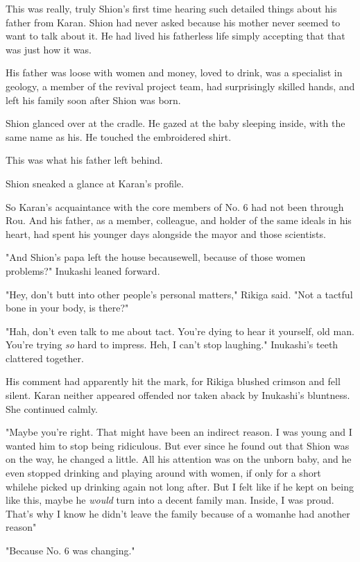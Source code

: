 This was really, truly Shion's first time hearing such detailed things
about his father from Karan. Shion had never asked because his mother
never seemed to want to talk about it. He had lived his fatherless life
simply accepting that that was just how it was.

His father was loose with women and money, loved to drink, was a
specialist in geology, a member of the revival project team, had
surprisingly skilled hands, and left his family soon after Shion was
born.

Shion glanced over at the cradle. He gazed at the baby sleeping inside,
with the same name as his. He touched the embroidered shirt.

This was what his father left behind.

Shion sneaked a glance at Karan's profile.

So Karan's acquaintance with the core members of No. 6 had not been
through Rou. And his father, as a member, colleague, and holder of the
same ideals in his heart, had spent his younger days alongside the mayor
and those scientists.

"And Shion's papa left the house because\el well, because of those women
problems?" Inukashi leaned forward.

"Hey, don't butt into other people's personal matters," Rikiga said.
"Not a tactful bone in your body, is there?"

"Hah, don't even talk to me about tact. You're dying to hear it
yourself, old man. You're trying \emph{so} hard to impress. Heh, I can't stop
laughing." Inukashi's teeth clattered together.

His comment had apparently hit the mark, for Rikiga blushed crimson and
fell silent. Karan neither appeared offended nor taken aback by
Inukashi's bluntness. She continued calmly.

"Maybe you're right. That might have been an indirect reason. I
was young and I wanted him to stop being ridiculous. But ever since he
found out that Shion was on the way, he changed a little. All his
attention was on the unborn baby, and he even stopped drinking and
playing around with women, if only for a short while\el he picked up
drinking again not long after. But I felt like if he kept on being like
this, maybe he \emph{would} turn into a decent family man. Inside, I was proud.
That's why I know he didn't leave the family because of a woman\el he
had another reason\el "

"Because No. 6 was changing."

